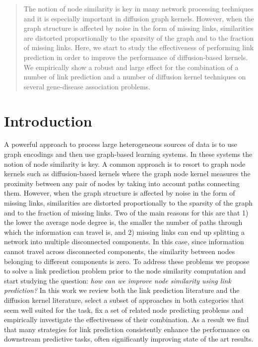 \begin{abstract}

The notion of node similarity is key in many network processing techniques and
it is especially important in diffusion graph kernels. However, when the graph
structure is affected by noise in the form of missing links, similarities are
distorted  proportionally to the sparsity of the graph and to the fraction of
missing links. Here, we start to study the effectiveness of performing link
prediction  in order to improve the performance of diffusion-based kernels. We
empirically show a robust and large effect for the combination of a number of
link prediction and a number of diffusion kernel techniques on several
gene-disease association problems.

\end{abstract}


\section{Introduction}

A powerful approach to process large heterogeneous sources of data is to use
graph encodings \cite{proceeding1} \cite{jour1} and then use graph-based
learning systems. In these systems the notion of node similarity is key. A
common approach is to resort to graph node kernels such as diffusion-based
kernels \cite{proceeding2} where the graph node kernel measures the proximity
between any pair of nodes by taking into account paths connecting them.
However, when the graph structure is affected by noise in the form of missing
links, similarities are distorted  proportionally to the sparsity of the graph
and to the fraction of missing links. Two of the main reasons for this are
that 1) the lower the average node degree is, the smaller the number of paths
through which the information can travel is, and 2) missing links can end up
splitting a network into multiple disconnected components. In this case, since
information cannot travel across disconnected components, the similarity
between nodes belonging to different components is zero. To address these
problems we propose to solve  a link prediction problem prior to the node
similarity computation and start studying the question: {\em how can we
improve node similarity using link prediction?} In this work we review both
the link prediction literature and the diffusion kernel literature, select a
subset of approaches in both categories that seem well suited for the task,
fix a set of related node predicting problems and empirically investigate the
effectiveness of their combination. As a result we find that many strategies
for link prediction consistently enhance the performance on downstream
predictive tasks, often significantly improving state of the art results.
